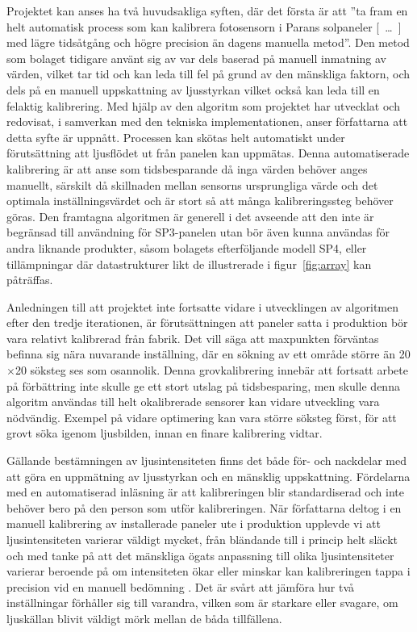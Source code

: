         Projektet kan anses ha två huvudsakliga syften, där det första är att ''ta fram en helt automatisk process som kan kalibrera fotosensorn i Parans solpaneler [~\dots~] med lägre tidsåtgång och högre precision än dagens manuella metod''. 
        Den metod som bolaget tidigare använt sig av var dels baserad på manuell inmatning av värden, vilket tar tid och kan leda till fel på grund av den mänskliga faktorn, och dels på en manuell uppskattning av ljusstyrkan vilket också kan leda till en felaktig kalibrering. 
        Med hjälp av den algoritm som projektet har utvecklat och redovisat, i samverkan med den tekniska implementationen, anser författarna att detta syfte är uppnått. Processen kan skötas helt automatiskt under förutsättning att ljusflödet ut från panelen kan uppmätas. 
        Denna automatiserade kalibrering är att anse som tidsbesparande då inga värden behöver anges manuellt, särskilt då skillnaden mellan sensorns ursprungliga värde och det optimala inställningsvärdet och är stort så att många kalibreringssteg behöver göras. Den framtagna algoritmen är generell i det avseende att den inte är begränsad till användning för SP3-panelen utan bör även kunna användas för andra liknande produkter, såsom bolagets efterföljande modell SP4, eller tillämpningar där datastrukturer likt de illustrerade i figur~\ref{fig:array} kan påträffas.\bigskip

        \newpage
        Anledningen till att projektet inte fortsatte vidare i utvecklingen av algoritmen efter den tredje iterationen, är förutsättningen att paneler satta i produktion bör vara relativt kalibrerad från fabrik. Det vill säga att maxpunkten förväntas befinna sig nära nuvarande inställning, där en sökning av ett område större än 20$\times$20 söksteg ses som osannolik. Denna grovkalibrering innebär att fortsatt arbete på förbättring inte skulle ge ett stort utslag på tidsbesparing, men skulle denna algoritm användas till helt okalibrerade sensorer kan vidare utveckling vara nödvändig. Exempel på vidare optimering kan vara större söksteg först, för att grovt söka igenom ljusbilden, innan en finare kalibrering vidtar.\bigskip

        Gällande bestämningen av ljusintensiteten finns det både för- och nackdelar med att göra en uppmätning av ljusstyrkan och en mänsklig uppskattning. Fördelarna med en automatiserad inläsning är att kalibreringen blir standardiserad och inte behöver bero på den person som utför kalibreringen. När författarna deltog i en manuell kalibrering av installerade paneler ute i produktion upplevde vi att ljusintensiteten varierar väldigt mycket, från bländande till i princip helt släckt och med tanke på att det mänskliga ögats anpassning till olika ljusintensiteter varierar beroende på om intensiteten ökar eller minskar kan kalibreringen tappa i precision vid en manuell bedömning \cite[s.~273]{aot}. Det är svårt att jämföra hur två inställningar förhåller sig till varandra, vilken som är starkare eller svagare, om ljuskällan blivit väldigt mörk mellan de båda tillfällena.\bigskip 

